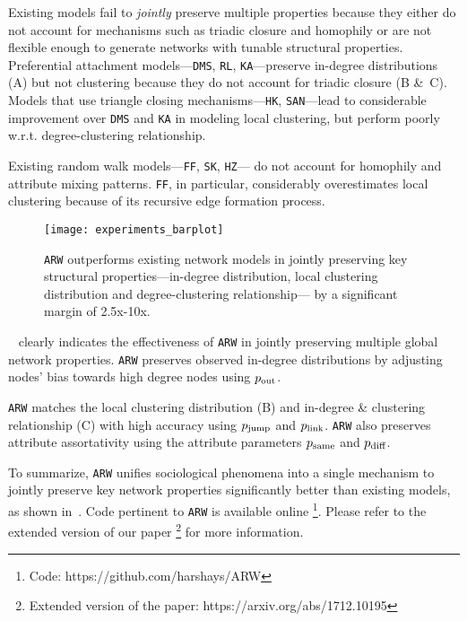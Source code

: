 Existing models fail to \textit{jointly} preserve multiple properties
because they either do not account for mechanisms such as triadic closure and homophily
or are not flexible enough to generate networks with tunable structural properties.
Preferential attachment models---\texttt{DMS}, \texttt{RL}, \texttt{KA}---preserve in-degree
distributions (A) but not clustering because they do not account for triadic closure
(B \&~C).
Models that use triangle closing mechanisms---\texttt{HK}, \texttt{SAN}---lead to considerable improvement
over \texttt{DMS} and \texttt{KA} in modeling local clustering, but perform poorly w.r.t. degree-clustering
relationship.

Existing random walk models---\texttt{FF}, \texttt{SK}, \texttt{HZ}---
do not account for homophily and attribute mixing patterns.
\texttt{FF}, in particular, considerably overestimates local clustering because of its recursive edge
formation process.

\begin{figure}
	\centering
	\texttt{[image: experiments\_barplot]}
		\caption{\texttt{ARW} outperforms
			existing network models in jointly preserving key structural properties---in-degree
			distribution, local clustering distribution and degree-clustering relationship---
			by a significant margin of 2.5x-10x.
		}
		\label{fig:barplot}
		\vspace{-10pt}
\end{figure}

~ clearly indicates the effectiveness
of \texttt{ARW} in {jointly} preserving multiple
global network properties. \texttt{ARW} preserves observed
in-degree distributions by adjusting nodes' bias towards high degree nodes
using $p_{\scriptsize\mbox{out}}$.

\texttt{ARW} matches the local clustering
distribution  (B) and in-degree \& clustering relationship
(C) with high accuracy using $p_{\scriptsize\mbox{jump}}$ and
$p_{\scriptsize\mbox{link}}$. \texttt{ARW} also preserves attribute assortativity using
the attribute parameters $p_{\scriptsize\mbox{same}}$ and $p_{\scriptsize\mbox{diff}}$.

To summarize, \texttt{ARW} unifies sociological phenomena into a single
mechanism to jointly preserve key network properties significantly
better than existing models, as shown in~.
Code pertinent to \texttt{ARW} is available online \footnote{Code: https://github.com/harshays/ARW}.
Please refer to the extended version of
our paper \footnote{Extended version of the paper: https://arxiv.org/abs/1712.10195} for
more information.
